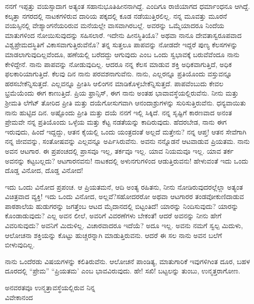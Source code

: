 \vspace{0.2cm}

ನನಗೆ ಇಪ್ಪತ್ತು ವಯಸ್ಸಾದಾಗ ಅತ್ಯಂತ ಸಹಾನುಭೂತಿಹೀನನಾಗಿದ್ದೆ. ಎಂದಿಗೂ ರಾಜಿಯಾಗದ ಧರ್ಮಾಂಧನೂ ಆಗಿದ್ದೆ. ಕಲ್ಕತ್ತಾ ನಗರದಲ್ಲಿ ನಾಟಕಗಳಿರುವ ದಾರಿಯ ಪಕ್ಕದಲ್ಲಿ ಕೂಡ ನಡೆಯುತ್ತಿರಲಿಲ್ಲ. ನನ್ನ ಮೂವತ್ತು ಮೂರನೆ ವಯಸ್ಸಿನಲ್ಲಿ ವೇಶ್ಯಾಂಗನೆಯರಿರುವ ಮನೆಯಲ್ಲೇ ವಾಸವಾಗಿರಬಲ್ಲೆ. ಅವರನ್ನು ಒಮ್ಮೆಯಾದರೂ ನಿಂದೆಯ ಮಾತುಗಳಿಂದ ನೋಯಿಸುವುದನ್ನು ಸಹಿಸಲಾರೆ. ಇದೇನು ಹೀನಸ್ಥಿತಿಯೊ? ಅಥವಾ ನಾನೂ ದೇವತಾಸ್ವರೂಪವಾದ ವಿಶ್ವಪ್ರೇಮದಸ್ಥಿತಿಗೆ ವಿಕಾಸವಾಗುತ್ತಿರುವೆನೊ? ತನ್ನ ಸುತ್ತಲೂ ಪಾಪವನ್ನು ನೋಡದೇ ಇದ್ದರೆ ಪುಣ್ಯ ಕೆಲಸಗಳನ್ನು ಮಾಡಲಾಗುವುದಿಲ್ಲವೆಂದೂ, ಹಣೆಯಲ್ಲಿ ಬರೆದದ್ದು ಆಗುವುದು ಎಂಬ ಒಂದು ಸ್ವಭಾವಕ್ಕೆ ಬರುವೆವೆಂದೂ ನಾನು ಕೇಳಿದ್ದೇನೆ. ನಾನು ಪಾಪವನ್ನು ನೋಡುವುದಿಲ್ಲ. ಆದರೂ ನನ್ನ ಕೆಲಸ ಮಾಡುವ ಶಕ್ತಿ ಅಧಿಕವಾಗುತ್ತಿದೆ, ಅಧಿಕ ಫಲಕಾರಿಯಾಗುತ್ತಿದೆ. ಕೆಲವು ದಿನ ನಾನು ಪರವಶನಾಗುವೆನು. ನಾನು, ಎಲ್ಲರನ್ನೂ ಪ್ರತಿಯೊಂದು ವಸ್ತುವನ್ನೂ ಹರಸಬೇಕೆನ್ನಿಸುತ್ತದೆ. ಎಲ್ಲವನ್ನೂ ಪ್ರೀತಿಸಿ ಆಲಿಂಗನ ಮಾಡಿಕೊಳ್ಳಬೇಕೆನ್ನಿಸುತ್ತದೆ. ಪಾಪವೆಂಬುದು ಕೇವಲ ಭ್ರಮೆಯೆಂದು ಈಗ ಕಾಣುತ್ತಿದೆ. ಪ್ರಿಯ ಫ್ರಾನ್ಸಿಸ್, ಈಗ ನಾನು ಅಂತಹ ಭಾವಾವಸ್ಥೆಯಲ್ಲಿರುವೆನು. ನೀನು ಮತ್ತು ಶ‍್ರೀಮತಿ ಲೆಗೆಟ್ ತೋರಿದ ಪ್ರೀತಿ ಮತ್ತು ದಯೆಗೋಸುಗವಾಗಿ ಆನಂದಾಶ್ರುಗಳನ್ನು ಸುರಿಸುತ್ತಿರುವೆನು. ಧನ್ಯವಾಯಿತು ನಾನು ಹುಟ್ಟಿದ ದಿನ. ಅಷ್ಟೊಂದು ಪ್ರೀತಿ ಮತ್ತು ದಯೆ ನನಗೆ ಇಲ್ಲಿ ಸಿಕ್ಕಿದೆ. ನನ್ನ ಸೃಷ್ಟಿಗೆ ಕಾರಣವಾದ ಅನಂತ ಪ್ರೇಮವೇ ನನ್ನ ಪ್ರತಿಯೊಂದು ಒಳ್ಳೆಯ ಮತ್ತು ಕೆಟ್ಟ ನಡತೆಯನ್ನು ಕಾದಿರುವುದು. ಹೆದರಬೇಡ, ನಾನು ಈಗ ಇರುವುದು, ಹಿಂದೆ ಇದ್ದದ್ದು, ಆತನ ಕೈಯಲ್ಲಿ ಒಂದು ಯಂತ್ರದಂತೆ ಅಲ್ಲದೆ ಮತ್ತೇನು? ನನ್ನ ಆಪ್ತ! ಆತನ ಸೇವೆಗಾಗಿ ನನ್ನ ಜೀವವನ್ನು, ಸಂತೋಷವನ್ನು ಎಲ್ಲವನ್ನೂ ಅರ್ಪಿಸಿರುವೆನು. ಅವನು ನನ್ನೊಡನೆ ಆಟವಾಡುವ ಪ್ರಿಯತಮ. ನಾನು ಅವನ ಆಟಗಾರ. ಈ ಪ್ರಪಂಚದಲ್ಲಿ ಪ್ರಾಸವೂ ಇಲ್ಲ, ತರ್ಕವೂ ಇಲ್ಲ. ಯಾವ ನಿಯಮವೂ ಇಲ್ಲ. ಯಾವ ತರ್ಕ ಅವನನ್ನು ಕಟ್ಟಬಲ್ಲದು? ಆಟಗಾರನವನು! ನಾಟಕದಲ್ಲಿ ಅಳುನಗುಗಳಿಂದ ಆಡುತ್ತಿರುವನು! ಹೇಳುವಂತೆ ಇದು ಒಂದು ದೊಡ್ಡ ವಿನೋದ, ದೊಡ್ಡ ವಿನೋದ!


\vspace{0.2cm}

ಇದು ಒಂದು ವಿನೋದ ಪ್ರಪಂಚ. ಆ ಪ್ರಿಯತಮನೆ, ಆದಿ ಅಂತ್ಯ ರಹಿತನು, ನೀನು ನೋಡಿರುವುದರಲ್ಲೆಲ್ಲಾ ಅತ್ಯಂತ ವಿಚಿತ್ರವಾದ ವ್ಯಕ್ತಿ! ಇದು ಒಂದು ವಿನೋದ, ಅಲ್ಲವೆ?ಸಹೋದರರೋ ಅಥವಾ ಆಟಗಾರರ ತಂಡವೋ\enginline{-}ಕುಣಿದಾಡುವ ಪಾಠಶಾಲೆಯ ಹುಡುಗರನ್ನು ಜಗತ್ತೆಂಬ ಆಟದ ಮೈದಾನದಲ್ಲಿ ಬಿಟ್ಟಂತಿದೆ! ಯಾರನ್ನು ನಿಂದಿಸುವುದು? ಯಾರನ್ನು ಕೊಂಡಾಡುವುದು? ಎಲ್ಲ ಅವನ ಲೀಲೆ, ಅವರಿಗೆ ವಿವರಣೆಗಳು ಬೇಕಂತೆ! ಆದರೆ ಅವನನ್ನು ನೀನು ಹೇಗೆ ವಿವರಿಸುವುದು? ಅವನಿಗೆ ಮಿದುಳಿಲ್ಲ. ವಿಚಾರವಾದರೂ ಇದೆಯೆ? ಅದೂ ಇಲ್ಲ. ಅವನು ನಮಗೆ ಸ್ವಲ್ಪ ಮಿದುಳು, ಆಲೋಚನಾ ಶಕ್ತಿಯನ್ನು ಕೊಟ್ಟು ಹುಚ್ಚರನ್ನಾಗಿ ಮಾಡುತ್ತಿರುವನು. ಆದರೆ ಈ ಸಲ ನಾನು ಅವನ ಬಲೆಗೆ ಬೀಳುವುದಿಲ್ಲ.

\vspace{0.2cm}

ನಾನು ಒಂದೆರಡು ವಿಷಯಗಳನ್ನು ಕಲಿತಿರುವೆನು. ಆಲೋಚನೆ ಪಾಂಡಿತ್ಯ, ಮಾತುಗಾರಿಕೆ ಇವುಗಳಿಗಿಂತ ದೂರ, ಬಹಳ ದೂರದಲ್ಲಿ “ಪ್ರೇಮ” “ಪ್ರಿಯತಮ’ ಎಂಬ ಭಾವವಿರುವುದು. ಹೇ! ಸಖಿ! ಬಟ್ಟಲನ್ನು ತುಂಬು, ಉನ್ಮತ್ತರಾಗೋಣ.

{\flushright
ಅನವರತವೂ ಉನ್ಮತ್ತಾವಸ್ಥೆಯಲ್ಲಿರುವ ನಿನ್ನ\\ವಿವೇಕಾನಂದ\par}

